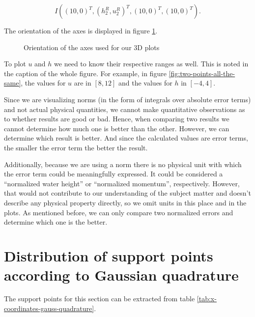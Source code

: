 \documentclass[a4paper, twoside]{article}
\begin{document}
\begin{equation*}
  I\left(\left(10, 0\right)^T, \left(h_2^R, u_2^R\right)^T, \left(10, 0\right)^T, \left(10, 0\right)^T\right).
\end{equation*}

The orientation of the axes is displayed in figure \ref{fig:orientation-of-axes}.

\begin{figure}[th]
  \centering
  \caption{Orientation of the axes used for our 3D plots}
  \label{fig:orientation-of-axes}
\end{figure}

To plot $u$ and $h$ we need to know their respective ranges as well. This is noted in the caption of the whole figure. For example, in figure \ref{fig:two-points-all-the-same}, the values for $u$ are in $[8, 12]$ and the values for $h$ in $[-4,4]$.

Since we are visualizing norms (in the form of integrals over absolute error terms) and not actual physical quantities, we cannot make quantitative observations as to whether results are good or bad. Hence, when comparing two results we cannot determine how much one is better than the other. However, we can determine which result is better. And since the calculated values are error terms, the smaller the error term the better the result.

Additionally, because we are using a norm there is no physical unit with which the error term could be meaningfully expressed. It could be considered a ``normalized water height'' or ``normalized momentum'', respectively. However, that would not contribute to our understanding of the subject matter and doesn't describe any physical property directly, so we omit units in this place and in the plots. As mentioned before, we can only compare two normalized errors and determine which one is the better.

\section{Distribution of support points according to Gaussian quadrature}
\label{sec:results}

The support points for this section can be extracted from table \ref{tab:x-coordinates-gauss-quadrature}.
\end{document}
